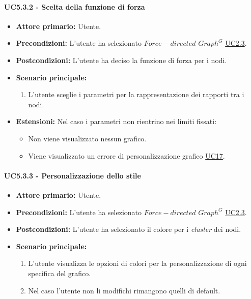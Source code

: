 \paragraph{UC5.3.2 - Scelta della funzione di forza}
\label{sec:UC5.3.2}
    \begin{itemize}
        \item \textbf{Attore primario:} Utente.
        \item \textbf{Precondizioni:} L'utente ha selezionato $Force-directed$ $Graph^{G}$ \hyperref[sec:UC2.3]{UC2.3}.
	    \item \textbf{Postcondizioni:} L'utente ha deciso la funzione di forza per i nodi.
	    \item \textbf{Scenario principale:} 
	    \begin{enumerate}
	    		\item L'utente sceglie i parametri per la rappresentazione dei rapporti tra i nodi.
		\end{enumerate}
	    \item \textbf{Estensioni:} Nel caso i parametri non rientrino nei limiti fissati:
              \begin{itemize}
                  \item Non viene visualizzato nessun grafico.
                  \item Viene visualizzato un errore di personalizzazione grafico \hyperref[sec:UC17 - Errore di personalizzazione]{UC17}.
              \end{itemize}
    \end{itemize}
\paragraph{UC5.3.3 - Personalizzazione dello stile}
\label{sec:UC5.3.3}
    \begin{itemize}
        \item \textbf{Attore primario:} Utente.
        \item \textbf{Precondizioni:} L'utente ha selezionato $Force-directed$ $Graph^{G}$ \hyperref[sec:UC2.3]{UC2.3}.
	    \item \textbf{Postcondizioni:} L'utente ha selezionato il colore per i \textit{cluster} dei nodi.
	    \item \textbf{Scenario principale:} 
	    \begin{enumerate}
	    		\item L'utente visualizza le opzioni di colori per la personalizzazione di ogni specifica del grafico.
	    		\item Nel caso l'utente non li modifichi rimangono quelli di default.
		\end{enumerate}
    \end{itemize}

